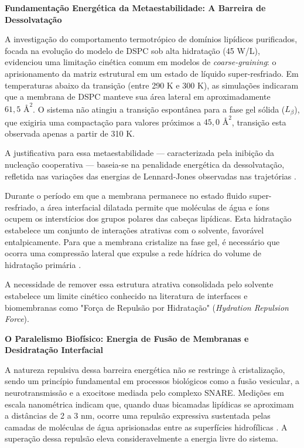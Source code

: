 \vspace{1em}
\noindent\textbf{Fundamentação Energética da Metaestabilidade: A Barreira de Dessolvatação}

A investigação do comportamento termotrópico de domínios lipídicos purificados, focada na evolução do modelo de DSPC sob alta hidratação (45 W/L), evidenciou uma limitação cinética comum em modelos de \textit{coarse-graining}: o aprisionamento da matriz estrutural em um estado de líquido super-resfriado. Em temperaturas abaixo da transição (entre 290 K e 300 K), as simulações indicaram que a membrana de DSPC manteve sua área lateral em aproximadamente $61,5\text{ \AA}^2$. O sistema não atingiu a transição espontânea para a fase gel sólida ($L_\beta$), que exigiria uma compactação para valores próximos a $45,0\text{ \AA}^2$, transição esta observada apenas a partir de 310 K.

A justificativa para essa metaestabilidade — caracterizada pela inibição da nucleação cooperativa — baseia-se na penalidade energética da dessolvatação, refletida nas variações das energias de Lennard-Jones observadas nas trajetórias \cite{kowalik2015}.

Durante o período em que a membrana permanece no estado fluido super-resfriado, a área interfacial dilatada permite que moléculas de água e íons ocupem os interstícios dos grupos polares das cabeças lipídicas. Esta hidratação estabelece um conjunto de interações atrativas com o solvente, favorável entalpicamente. Para que a membrana cristalize na fase gel, é necessário que ocorra uma compressão lateral que expulse a rede hídrica do volume de hidratação primária \cite{kowalik2015}.

A necessidade de remover essa estrutura atrativa consolidada pelo solvente estabelece um limite cinético conhecido na literatura de interfaces e biomembranas como "Força de Repulsão por Hidratação" (\textit{Hydration Repulsion Force}).

\vspace{1em}
\noindent\textbf{O Paralelismo Biofísico: Energia de Fusão de Membranas e Desidratação Interfacial }

A natureza repulsiva dessa barreira energética não se restringe à cristalização, sendo um princípio fundamental em processos biológicos como a fusão vesicular, a neurotransmissão e a exocitose mediada pelo complexo SNARE. Medições em escala nanométrica indicam que, quando duas bicamadas lipídicas se aproximam a distâncias de 2 a 3 nm, ocorre uma repulsão expressiva sustentada pelas camadas de moléculas de água aprisionadas entre as superfícies hidrofílicas \cite{krok2024}. A superação dessa repulsão eleva consideravelmente a energia livre do sistema.

